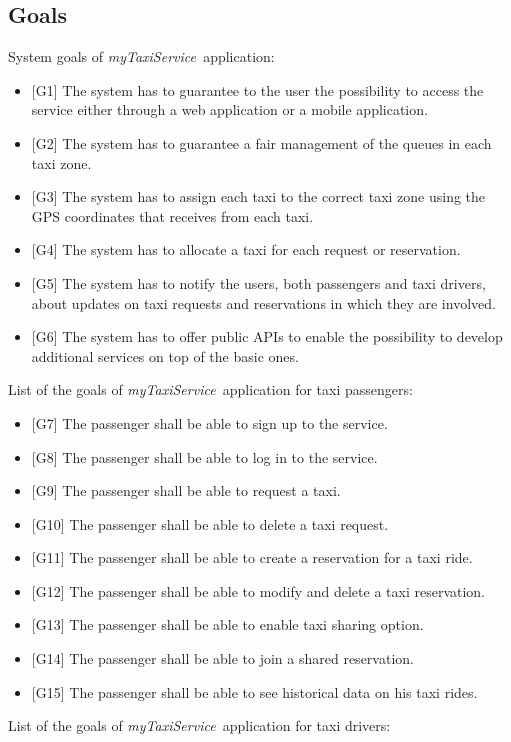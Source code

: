 \documentclass[a4paper,11pt]{report} %
\newcommand{\mts}{\mbox{\normalfont\itshape myTaxiService\ }}
\begin{document}
	\subsection{Goals} \label{sec:goals}
	System goals of \mts application:
	\begin{itemize}
		\item {[}G1{]} The system has to guarantee to the user the possibility to access the service either through a web application or a mobile application.
		\item {[}G2{]} The system has to guarantee a fair management of the queues in each taxi zone.
		\item {[}G3{]} The system has to assign each taxi to the correct taxi zone using the GPS coordinates that receives from each taxi.
		\item {[}G4{]} The system has to allocate a taxi for each request or reservation.
		\item {[}G5{]} The system has to notify the users, both passengers and taxi drivers, about updates on taxi requests and reservations in which they are involved.
		\item {[}G6{]} The system has to offer public APIs to enable the possibility to develop additional services on top of the basic ones.
	\end{itemize}
	List of the goals of \mts application for taxi passengers:
		\begin{itemize}
			\item {[}G7{]} The passenger shall be able to sign up to the service.
			\item {[}G8{]} The passenger shall be able to log in to the service.
			\item {[}G9{]} The passenger shall be able to request a taxi.
			\item {[}G10{]} The passenger shall be able to delete a taxi request.
			\item {[}G11{]} The passenger shall be able to create a reservation for a taxi ride.
			\item {[}G12{]} The passenger shall be able to modify and delete a taxi reservation.
			\item {[}G13{]} The passenger shall be able to enable taxi sharing option.
			\item {[}G14{]} The passenger shall be able to join a shared reservation.
			\item {[}G15{]} The passenger shall be able to see historical data on his taxi rides.
		\end{itemize}
		List of the goals of \mts application for taxi drivers:
\end{document}

